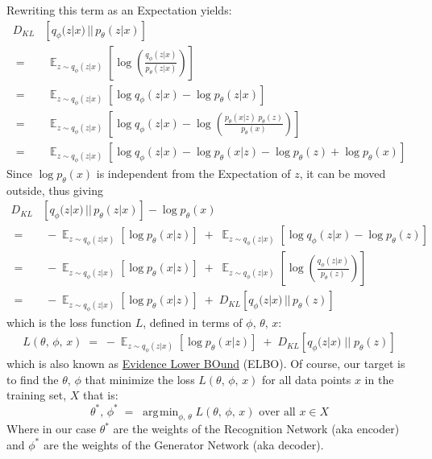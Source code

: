 \documentclass[12pt]{report}
\DeclareMathOperator{\E}{\mathbb{E}}
\DeclareMathOperator*{\argmin}{\arg\!\min}
\begin{document}
Rewriting this term as an Expectation yields:
\begin{align*}
    D_{KL} &\left[ q_{\phi}(z | x) \,||\, p_{\theta}(z | x) \right] \\[2ex]
    \;=&\; \E_{z \sim q_{\phi}(z|x)}\left[ \log \left(
        \frac{q_{\phi}(z | x)}{p_{\theta}(z | x)} \right) \right] \\[2ex]
    \;=&\; \E_{z \sim q_{\phi}(z|x)}\left[ \log q_{\phi}(z | x)
        - \log p_{\theta}(z | x) \right] \\[2ex]
    \;=&\; \E_{z \sim q_{\phi}(z|x)}\left[ \log q_{\phi}(z | x)
        - \log \left( \frac{p_{\theta}(x | z) \; p_{\theta}(z)}
            {p_{\theta}(x)} \right) \right] \\[2ex]
    \;=&\; \E_{z \sim q_{\phi}(z|x)}\left[ \log q_{\phi}(z | x)
        - \log p_{\theta}(x | z) - \log p_{\theta}(z)
            + \log p_{\theta}(x) \right]
\end{align*}
Since $\log p_{\theta}(x)$ is independent from the Expectation of $z$, it can be moved
outside, thus giving
\begin{align*}
    D_{KL} &\left[ q_{\phi}(z | x) \,||\, p_{\theta}(z | x) \right]
        - \log p_{\theta}(x) \\[2ex]
    \;=&\; -\E_{z \sim q_{\phi}(z|x)}[\log p_{\theta}(x | z)] \;+\;
        \E_{z \sim q_{\phi}(z|x)}[\log q_{\phi}(z | x) - \log p_{\theta}(z)] \\[2ex]
    \;=&\; -\E_{z \sim q_{\phi}(z|x)}[\log p_{\theta}(x | z)] \;+\;
        \E_{z \sim q_{\phi}(z|x)} \left[ \log \left(
        \frac{q_{\phi}(z | x)}{p_{\theta}(z)} \right) \right] \\[2ex]
    \;=&\; -\E_{z \sim q_{\phi}(z|x)}[\log p_{\theta}(x | z)] \;+\;
        D_{KL} \left[ q_{\phi}(z | x) \,||\, p_{\theta}(z) \right]
\end{align*}
which is the loss function $L$, defined in terms of $\phi,\, \theta,\, x$:
\begin{align*}
    L(\theta,\, \phi,\, x) \;=\; -\E_{z \sim q_{\phi}(z | x)}
                                    \left[\log p_{\theta}(x | z) \right]\;
                              +\; D_{KL}\left[q_{\phi}(z | x) \;||\; p_{\theta}(z) \right]
\end{align*}
which is also known as
\href{https://en.wikipedia.org/wiki/Variational_Bayesian_methods#Evidence_lower_bound}
{Evidence Lower BOund} (ELBO).
Of course, our target is to find the $\theta,\, \phi$ that minimize the loss
$L(\theta,\, \phi,\, x)$ for all data points $x$ in the training set, $X$ that is:
$$\theta^*,\, \phi^* \;=\; \argmin_{\phi,\, \theta} L(\theta,\, \phi,\, x)
\text{ over all } x \in X$$
Where in our case $\theta^*$ are the weights of the Recognition Network (aka encoder)
and $\phi^*$ are the weights of the Generator Network (aka decoder). \clearpage
\end{document}
